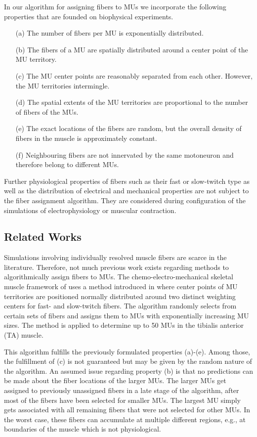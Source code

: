 In our algorithm for assigning fibers to MUs we incorporate the following properties that are founded on biophysical experiments. 
\begin{itemize}
\item[(a)] The number of fibers per MU is  exponentially distributed. 
\item[(b)] The fibers of a MU are spatially distributed around a center point of the MU territory.
\item[(c)] The MU center points are reasonably separated from each other. However, the MU territories intermingle. 
\item[(d)] The spatial extents of the MU territories are proportional to the number of fibers of the MUs. 
\item[(e)] The exact locations of the fibers are random, but the overall density of fibers in the muscle is approximately constant. 
\item[(f)] Neighbouring fibers are not innervated by the same motoneuron and therefore belong to different MUs.
\end{itemize}

Further physiological properties of fibers such as their fast or slow-twitch type as well as the distribution of electrical and mechanical properties are not subject to the fiber assignment algorithm. They are considered during configuration of the simulations of electrophysiology or muscular contraction.

\subsection{Related Works}
Simulations involving individually resolved muscle fibers are scarce in the literature. Therefore, not much previous work exists regarding methods to algorithmically assign fibers to MUs. The chemo-electro-mechanical skeletal muscle framework of \cite{Heidlauf2013} uses a method introduced in \cite{Roehrle2012} where center points of MU territories are positioned normally distributed around two distinct weighting centers for fast- and slow-twitch fibers. 
The algorithm randomly selects from certain sets of fibers and assigns them to MUs with exponentially increasing MU sizes. 
The method is applied to determine up to 50 MUs in the tibialis anterior (TA) muscle.

This algorithm fulfills the previously formulated properties (a)-(e). Among those, the fulfillment of (c) is not guaranteed but may be given by the random nature of the algorithm. An assumed issue regarding property (b) is that no predictions can be made about the fiber locations of the larger MUs. The larger MUs get assigned to previously unassigned fibers in a late stage of the algorithm, after most of the fibers have been selected for smaller MUs. The largest MU simply gets associated with all remaining fibers that were not selected for other MUs. In the worst case, these fibers can accumulate at multiple different regions, e.g., at boundaries of the muscle which is not physiological.

